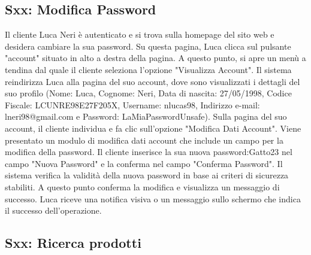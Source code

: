 \documentclass[12pt, a4paper, oneside]{book}
\begin{document}
    \subsection*{Sxx: Modifica Password}
    Il cliente Luca Neri è autenticato e si trova sulla homepage del sito web e desidera cambiare la sua password.
    Su questa pagina, Luca clicca sul pulsante "account" situato in alto a destra della pagina.
    A questo punto, si apre un menù a tendina dal quale il cliente seleziona l'opzione "Visualizza Account".
    Il sistema reindirizza Luca alla pagina del suo account, dove sono visualizzati i dettagli del suo profilo
    (Nome: Luca, Cognome: Neri, Data di nascita: 27/05/1998, Codice Fiscale: LCUNRE98E27F205X, Username: nlucas98,
     Indirizzo e-mail: lneri98@gmail.com e Password: LaMiaPasswordUnsafe).
    Sulla pagina del suo account, il cliente individua e fa clic sull'opzione "Modifica Dati Account".
    Viene presentato un modulo di modifica dati account che include un campo per la modifica della password.
    Il cliente inserisce la sua nuova password:Gatto23 nel campo "Nuova Password" e la conferma nel campo "Conferma Password".
    Il sistema verifica la validità della nuova password in base ai criteri di sicurezza stabiliti.
    A questo punto conferma la modifica e visualizza un messaggio di successo.
    Luca riceve una notifica visiva o un messaggio sullo schermo che indica il successo dell'operazione.

    \subsection*{Sxx: Ricerca prodotti}
\end{document}
